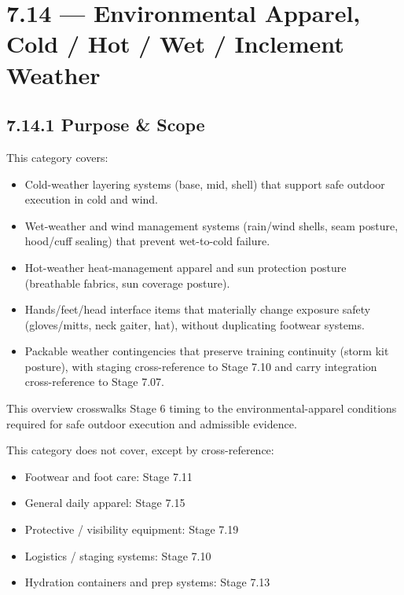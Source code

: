\documentclass[10pt]{article}
\begin{document}
\section*{7.14 — Environmental Apparel, Cold / Hot / Wet / Inclement Weather}
{}

\subsection*{7.14.1 Purpose \& Scope}
{}

This category covers:

\begin{itemize}
\item Cold-weather layering systems (base, mid, shell) that support safe outdoor execution in cold and wind.
\item Wet-weather and wind management systems (rain/wind shells, seam posture, hood/cuff sealing) that prevent wet-to-cold failure.
\item Hot-weather heat-management apparel and sun protection posture (breathable fabrics, sun coverage posture).
\item Hands/feet/head interface items that materially change exposure safety (gloves/mitts, neck gaiter, hat), without duplicating footwear systems.
\item Packable weather contingencies that preserve training continuity (storm kit posture), with staging cross-reference to Stage 7.10 and carry integration cross-reference to Stage 7.07.
\end{itemize}

This overview crosswalks Stage 6 timing to the environmental-apparel conditions required for safe outdoor execution and admissible evidence.

This category does not cover, except by cross-reference:

\begin{itemize}
\item Footwear and foot care: Stage 7.11
\item General daily apparel: Stage 7.15
\item Protective / visibility equipment: Stage 7.19
\item Logistics / staging systems: Stage 7.10
\item Hydration containers and prep systems: Stage 7.13
\end{itemize}
\end{document}
